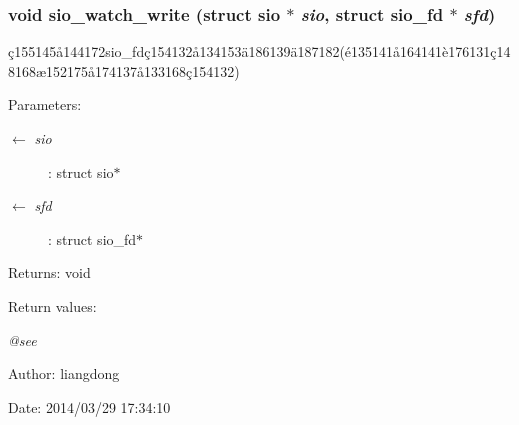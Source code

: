 \subsubsection{\setlength{\rightskip}{0pt plus 5cm}void sio\_\-watch\_\-write (struct sio $\ast$ {\em sio}, struct sio\_\-fd $\ast$ {\em sfd})}\label{sio_8h_a9}


\c{c}155145\aa{}144172sio\_\-fd\c{c}154132\aa{}134153\"{a}186139\"{a}187182(\'{e}135141\aa{}164141\`{e}176131\c{c}148168\ae{}152175\aa{}174137\aa{}133168\c{c}154132) 

\begin{Desc}
\item[Parameters:]
\begin{description}
\item[\mbox{$\leftarrow$} {\em sio}]: struct sio$\ast$ \item[\mbox{$\leftarrow$} {\em sfd}]: struct sio\_\-fd$\ast$ \end{description}
\end{Desc}
\begin{Desc}
\item[Returns:]void \end{Desc}
\begin{Desc}
\item[Return values:]
\begin{description}
\item[{\em @see}]\end{description}
\end{Desc}
\begin{Desc}
\item[Author:]liangdong \end{Desc}
\begin{Desc}
\item[Date:]2014/03/29 17:34:10 \end{Desc}
